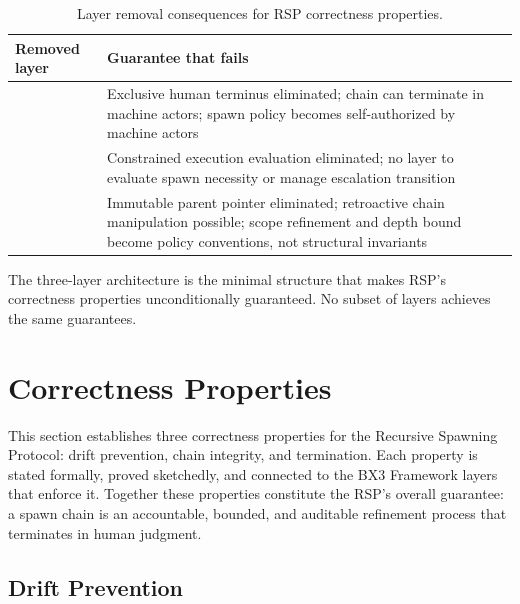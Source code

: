 \begin{table}[h]
\begin{center}
\begin{tabular}{p{3.2cm} p{4.8cm}}
\toprule
\textbf{Removed layer} & \textbf{Guarantee that fails} \\
\midrule
\purpose{} & Exclusive human terminus eliminated; chain can terminate in machine actors; spawn policy becomes self-authorized by machine actors \\
\bounds{} & Constrained execution evaluation eliminated; no layer to evaluate spawn necessity or manage escalation transition \\
\fact{} & Immutable parent pointer eliminated; retroactive chain manipulation possible; scope refinement and depth bound become policy conventions, not structural invariants \\
\bottomrule
\end{tabular}
\caption{Layer removal consequences for RSP correctness properties.}
\label{tab:layer_removal}
\end{center}
\end{table}

The three-layer architecture is the minimal structure that makes RSP's correctness properties unconditionally guaranteed. No subset of layers achieves the same guarantees.

\section{Correctness Properties}
\label{sec:correctness}

This section establishes three correctness properties for the Recursive Spawning Protocol: drift prevention, chain integrity, and termination. Each property is stated formally, proved sketchedly, and connected to the BX3 Framework layers that enforce it. Together these properties constitute the RSP's overall guarantee: a spawn chain is an accountable, bounded, and auditable refinement process that terminates in human judgment.

\subsection{Drift Prevention}
\label{sec:drift_prevention}

